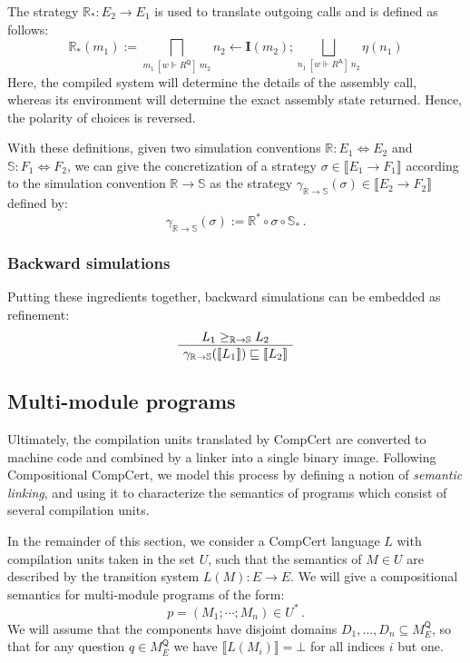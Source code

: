 \documentclass[sigplan,10pt,review,anonymous]{acmart}
\newcommand{\kw}[1]{\ensuremath{ \mathsf{#1} }}
\newcommand{\ifr}[1]{\ [{#1}]\ }
\begin{document}
The strategy $\mathbb{R}_* : E_2 \rightarrow E_1$
is used to translate outgoing calls
and is defined as follows:
\[
    \mathbb{R}_*(m_1) :=
       \bigsqcap_{m_1 \ifr{w \Vdash R^\kw{Q}} m_2}
       n_2 \leftarrow \mathbf{I}(m_2) ;
       \bigsqcup_{n_1 \ifr{w \Vdash R^\kw{A}} n_2}
       \eta(n_1)
\]
Here,
the compiled system will determine
the details of the assembly call,
whereas its environment will determine
the exact assembly state returned.
Hence, the polarity of choices is reversed.

With these definitions,
given two simulation conventions
$\mathbb{R} : E_1 \Leftrightarrow E_2$ and
$\mathbb{S} : F_1 \Leftrightarrow F_2$,
we can give the concretization of a strategy
$\sigma \in \llbracket E_1 \rightarrow F_1 \rrbracket$
according to the simulation convention
$\mathbb{R} \rightarrow \mathbb{S}$
as the strategy
$\gamma_{\mathbb{R} \rightarrow \mathbb{S}}(\sigma) \in
  \llbracket E_2 \rightarrow F_2 \rrbracket$
defined by:
\[
    \gamma_{\mathbb{R} \rightarrow \mathbb{S}}(\sigma) :=
    \mathbb{R}^* \circ \sigma \circ \mathbb{S}_* \,.
\]

\subsubsection{Backward simulations}

Putting these ingredients together,
backward simulations can be embedded as refinement:
\[
    \AxiomC{$L_1 \ge_{\mathbb{R} \rightarrow \mathbb{S}} L_2$}
    \UnaryInfC{$\gamma_{\mathbb{R} \rightarrow \mathbb{S}}
                (\llbracket L_1 \rrbracket) \sqsubseteq
                \llbracket L_2 \rrbracket$}
    \DisplayProof
\]

\subsection{Multi-module programs}

Ultimately,
the compilation units translated by CompCert
are converted to machine code
and combined by a linker into a single
binary image.
Following Compositional CompCert,
we model this process by defining a notion of
\emph{semantic linking},
and using it to characterize the semantics
of programs which consist of several compilation units.

In the remainder of this section,
we consider a CompCert language $L$
with compilation units taken in the set $U$,
such that the semantics of $M \in U$
are described by the transition system $L(M) : E \rightarrow E$.
We will give a compositional semantics
for multi-module programs of the form:
\[
    p = (M_1; \cdots; M_n) \in U^* \,.
\]
We will assume that the components have disjoint domains
$D_1, \ldots, D_n \subseteq M_E^\kw{Q}$,
so that for any question $q \in M_E^\kw{Q}$
we have $\llbracket L(M_i) \rrbracket = \bot$
for all indices $i$ but one.
\end{document}
